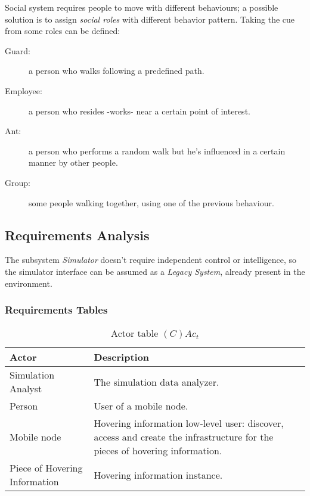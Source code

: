 Social system requires people to move with different behaviours; a possible
solution is to assign \emph{social roles} with different behavior pattern.
Taking the cue from \cite{human} some roles can be defined:

\begin{description}
	\item[Guard:] a person who walks following a predefined path.
	\item[Employee:] a person who resides -works- near a certain point of interest.
	\item[Ant:] a person who performs a random walk but he's influenced in a
		certain manner by other people.
	\item[Group:] some people walking together, using one of the previous
		behaviour.
\end{description}

\subsection{Requirements Analysis}

The subsystem \emph{Simulator} doesn't require independent control or
intelligence, so the simulator interface can be assumed as a \emph{Legacy
System}, already present in the environment.

\subsubsection*{Requirements Tables}

\begin{table}[H]
	\centering
	\begin{tabular}{|p{4cm}|p{8cm}|}
			\hline
			\textbf{Actor} & \textbf{Description} \\
			\hline
			Simulation Analyst & The simulation data analyzer. \\
			\hline
			Person & User of a mobile node. \\
			\hline
			Mobile node & Hovering information low-level user: discover, access and
			create the infrastructure for the pieces of hovering information. \\
			\hline
			Piece of Hovering Information & Hovering information instance. \\
			\hline
		\end{tabular}
	\caption{Actor table $(C)Ac_t$}
	\label{tab:cact}
\end{table}

